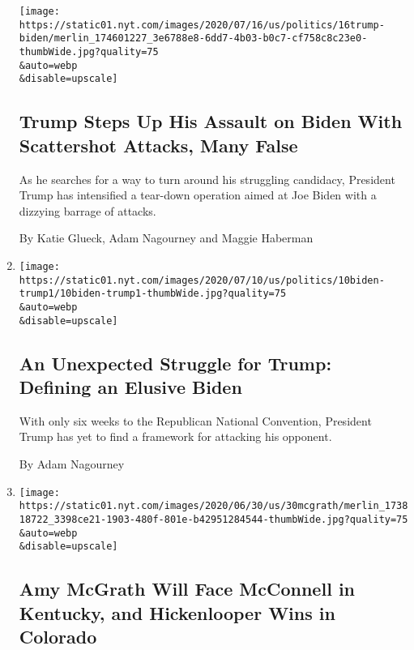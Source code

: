 \begin{enumerate}
  \texttt{[image: https://static01.nyt.com/images/2020/07/16/us/politics/16trump-biden/merlin\_174601227\_3e6788e8-6dd7-4b03-b0c7-cf758c8c23e0-thumbWide.jpg?quality=75\\\&auto=webp\\\&disable=upscale]}

  \hypertarget{trump-steps-up-his-assault-on-biden-with-scattershot-attacks-many-false}{%
  \subsection{Trump Steps Up His Assault on Biden With Scattershot
  Attacks, Many
  False}\label{trump-steps-up-his-assault-on-biden-with-scattershot-attacks-many-false}}

  As he searches for a way to turn around his struggling candidacy,
  President Trump has intensified a tear-down operation aimed at Joe
  Biden with a dizzying barrage of attacks.

  By Katie Glueck, Adam Nagourney and Maggie Haberman
\item
  \href{/2020/07/10/us/biden-trump.html}{}

  \texttt{[image: https://static01.nyt.com/images/2020/07/10/us/politics/10biden-trump1/10biden-trump1-thumbWide.jpg?quality=75\\\&auto=webp\\\&disable=upscale]}

  \hypertarget{an-unexpected-struggle-for-trump-defining-an-elusive-biden}{%
  \subsection{An Unexpected Struggle for Trump: Defining an Elusive
  Biden}\label{an-unexpected-struggle-for-trump-defining-an-elusive-biden}}

  With only six weeks to the Republican National Convention, President
  Trump has yet to find a framework for attacking his opponent.

  By Adam Nagourney
\item
  \href{/2020/06/30/us/politics/kentucky-senate-mcgrath-booker.html}{}

  \texttt{[image: https://static01.nyt.com/images/2020/06/30/us/30mcgrath/merlin\_173818722\_3398ce21-1903-480f-801e-b42951284544-thumbWide.jpg?quality=75\\\&auto=webp\\\&disable=upscale]}

  \hypertarget{amy-mcgrath-will-face-mcconnell-in-kentucky-and-hickenlooper-wins-in-colorado}{%
  \subsection{Amy McGrath Will Face McConnell in Kentucky, and
  Hickenlooper Wins in
  Colorado}\label{amy-mcgrath-will-face-mcconnell-in-kentucky-and-hickenlooper-wins-in-colorado}}


\end{enumerate}
